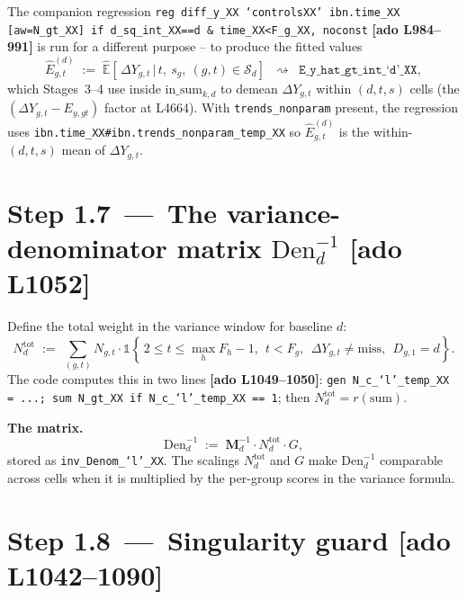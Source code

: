 \documentclass[11pt]{article}
\newcommand{\code}[1]{\texttt{\small #1}}
\newcommand{\Adoref}[1]{\textcolor{accent}{\footnotesize\textbf{[ado L#1]}}}
\newcommand{\1}{\mathbb{1}}
\newcommand{\Smpl}{\mathcal{S}}
\newcommand{\Ngt}{N_{g,t}}
\newcommand{\dY}{\Delta Y_{g,t}}
\begin{document}
\medskip
\noindent
The companion regression \code{reg diff\_y\_XX `controlsXX' ibn.time\_XX
[aw=N\_gt\_XX] if d\_sq\_int\_XX==d \& time\_XX<F\_g\_XX, noconst}
\Adoref{984--991} is run for a different purpose -- to produce the fitted
values
\begin{equation}
\widehat{E}_{g,t}^{(d)} \;:=\; \widehat{\mathbb{E}}\!\left[\,\dY \,\Big|\, t,\ s_g,\ (g,t)\in\Smpl_d\right]
\;\;\rightsquigarrow\;\; \texttt{E\_y\_hat\_gt\_int\_`d'\_XX},
\label{eq:Ehat}
\end{equation}
which Stages~3--4 use inside $\mathrm{in\_sum}_{k,d}$ to demean $\dY$ within
$(d,t,s)$ cells (the $(\dY - E_{y,gt})$ factor at L4664). With
\texttt{trends\_nonparam} present, the regression uses
\code{ibn.time\_XX\#ibn.trends\_nonparam\_temp\_XX} so $\widehat{E}^{(d)}_{g,t}$
is the within-$(d,t,s)$ mean of $\dY$.

\section[Step 1.7 -- The variance-denominator matrix Den_d^{-1} (L1052)]{Step 1.7 \,---\, The variance-denominator matrix $\mathrm{Den}_d^{-1}$ \Adoref{1052}}

Define the total weight in the variance window for baseline $d$:
\begin{equation}
N_d^{\mathrm{tot}}
\;:=\;
\sum_{(g,t)}\Ngt\cdot\1\!\left\{\,2\le t\le \max_h F_h - 1,\ \ t<F_g,\ \ \dY \ne \text{miss},\ \ D_{g,1}=d\right\}.
\label{eq:Ntot}
\end{equation}
The code computes this in two lines \Adoref{1049--1050}: \code{gen
N\_c\_`l'\_temp\_XX = ...; sum N\_gt\_XX if N\_c\_`l'\_temp\_XX == 1}; then
$N_d^{\mathrm{tot}} = r(\mathrm{sum})$.

\medskip\noindent\textbf{The matrix.}
\begin{equation}
\boxed{\;\mathrm{Den}_d^{-1}
\;:=\;
\bm{M}_d^{-1}\cdot N_d^{\mathrm{tot}}\cdot G,\;}
\label{eq:DenInv}
\end{equation}
stored as \code{inv\_Denom\_`l'\_XX}. The scalings $N_d^{\mathrm{tot}}$ and
$G$ make $\mathrm{Den}_d^{-1}$ comparable across cells when it is multiplied
by the per-group scores in the variance formula.

\section[Step 1.8 -- Singularity guard (L1042--1090)]{Step 1.8 \,---\, Singularity guard \Adoref{1042--1090}}
\end{document}
